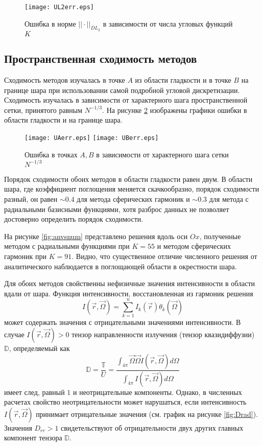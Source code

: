 \begin{figure}[ht!]
\centering
\texttt{[image: UL2err.eps]}
\caption{Ошибка в норме $||\cdot||_{DL_2}$ в зависимости от числа угловых функций $K$}
\label{fig:UL2err}
\end{figure}

\subsection{Пространственная сходимость методов}

Сходимость методов изучалась в точке $A$ из области гладкости и в точке $B$ на границе шара при использовании самой подробной угловой дискретизации. Сходимость изучалась в зависимости от характерного шага пространственной сетки, принятого равным $N^{-1/3}$. На рисунке \ref{fig:UAerr} изображены графики ошибки в области гладкости и на границе шара.

\begin{figure}[ht!]
\centering
\texttt{[image: UAerr.eps]}
\texttt{[image: UBerr.eps]}
\caption{Ошибка в точках $A, B$ в зависимости от характерного шага сетки $N^{-1/3}$}
\label{fig:UAerr}
\end{figure}

Порядок сходимости обоих методов в области гладкости равен двум. В области шара, где коэффициент поглощения меняется скачкообразно, порядок сходимости разный, он равен $\sim 0.4$ для метода сферических гармоник и $\sim 0.3$ для метода с радиальными базисными функциями, хотя разброс данных не позволяет достоверно определить порядок сходимости.

На рисунке \ref{fig:anvsnum} представлено решения вдоль оси $Ox$, полученные методом с радиальными функциями при $K = 55$ и методом сферических гармоник при $K = 91$. Видно, что существенное отличие численного решения от аналитического наблюдается в поглощающей области в окрестности шара.

Для обоих методов свойственны нефизичные значения интенсивности в области вдали от шара. Функция интенсивности, восстановленная из гармоник решения
\[
I(\vec r, \vec \Omega) = \sum_{k=1}^{n} I_k(\vec r) \theta_k (\vec \Omega)
\]
может содержать значения с отрицательными значениями интенсивности. В случае $I(\vec r, \vec \Omega) > 0$ тензор направленности излучения (тензор квазидиффузии) $\mathbb D$, определяемый как
\[
\mathbb D = \frac{\mathbb T}{U} = \frac{\int_{4\pi} \vec \Omega\vec \Omega I(\vec r, \vec \Omega) d\Omega}{\int_{4\pi} I(\vec r, \vec \Omega) d\Omega}
\]
имеет след, равный $1$ и неотрицательные компоненты. Однако, в численных расчетах свойство неотрицательности может нарушаться, если интенсивность $I(\vec r, \vec \Omega)$ принимает отрицательные значения (см. график на рисунке \ref{fig:Drad}). Значения $D_{rr} > 1$ свидетельствуют об отрицательности двух других главных компонент тензора $\mathbb D$.

